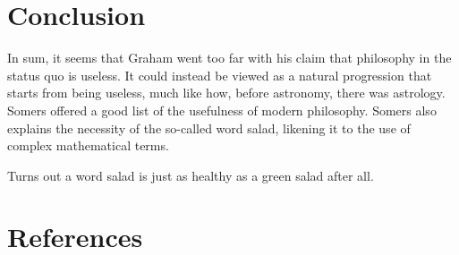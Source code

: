 \documentclass[12pt]{article}
\begin{document}
\section{Conclusion}

In sum, it seems that Graham went too far with his claim that philosophy in the status quo is useless. It could instead be viewed as a natural progression that starts from being useless, much like how, before astronomy, there was astrology. Somers offered a good list of the usefulness of modern philosophy. Somers also explains the necessity of the so-called word salad, likening it to the use of complex mathematical terms.

Turns out a word salad is just as healthy as a green salad after all.

\section{References}

\printbibliography[heading=none]

\end{document}
